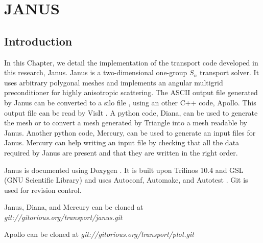 \chapter{\uppercase{Janus}}
\label{janus_chapter}
\section{Introduction}
In this Chapter, we detail the implementation of the transport code developed
in this research, Janus. Janus is a two-dimensional one-group $S_n$ transport
solver. It uses arbitrary polygonal meshes and implements an angular multigrid
preconditioner for highly anisotropic scattering. The ASCII output file generated
by Janus can be converted to a silo file \cite{silo}, using an other C++ code,
Apollo. This output file can be read by VisIt \cite{visit}. A python code, 
Diana, can be used to generate the mesh or to convert a mesh generated by Triangle
\cite{triangle} into a mesh readable by Janus. Another python code, Mercury,
can be used to generate an input files for Janus. Mercury can help writing an
input file by checking that all the data required by Janus are present and that
they are written in the right order. 

Janus is documented using Doxygen \cite{doxygen}. It is built upon Trilinos
10.4 \cite{trilinos} and GSL (GNU Scientific Library) \cite{gsl} and uses
Autoconf, Automake, and Autotest \cite{autoconf,automake}. Git \cite{git} 
is used for revision control. 

Janus, Diana, and Mercury can be cloned at 
\emph{\hbox{git://gitorious.org/transport/janus.git}} 

Apollo can be cloned at \emph{\hbox{git://gitorious.org/transport/plot.git}}

